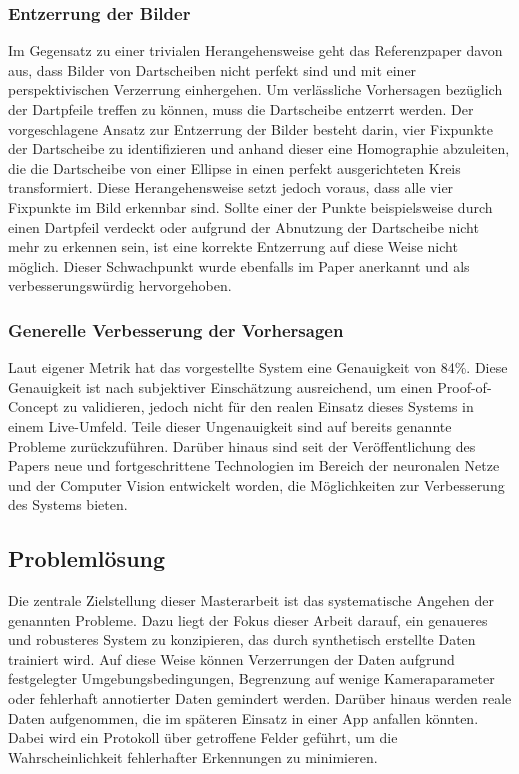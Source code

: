\subsubsection{Entzerrung der Bilder}
\label{sec:ziele:schwachstellen:entzerrung}

Im Gegensatz zu einer trivialen Herangehensweise geht das Referenzpaper davon aus, dass Bilder von Dartscheiben nicht perfekt sind und mit einer perspektivischen Verzerrung einhergehen. Um verlässliche Vorhersagen bezüglich der Dartpfeile treffen zu können, muss die Dartscheibe entzerrt werden. Der vorgeschlagene Ansatz zur Entzerrung der Bilder besteht darin, vier Fixpunkte der Dartscheibe zu identifizieren und anhand dieser eine Homographie abzuleiten, die die Dartscheibe von einer Ellipse in einen perfekt ausgerichteten Kreis transformiert. Diese Herangehensweise setzt jedoch voraus, dass alle vier Fixpunkte im Bild erkennbar sind. Sollte einer der Punkte beispielsweise durch einen Dartpfeil verdeckt oder aufgrund der Abnutzung der Dartscheibe nicht mehr zu erkennen sein, ist eine korrekte Entzerrung auf diese Weise nicht möglich. Dieser Schwachpunkt wurde ebenfalls im Paper anerkannt und als verbesserungswürdig hervorgehoben.

\subsubsection{Generelle Verbesserung der Vorhersagen}
\label{sec:ziele:schwachstellen:verbesserung}

Laut eigener Metrik hat das vorgestellte System eine Genauigkeit von 84\%. Diese Genauigkeit ist nach subjektiver Einschätzung ausreichend, um einen Proof-of-Concept zu validieren, jedoch nicht für den realen Einsatz dieses Systems in einem Live-Umfeld. Teile dieser Ungenauigkeit sind auf bereits genannte Probleme zurückzuführen. Darüber hinaus sind seit der Veröffentlichung des Papers neue und fortgeschrittene Technologien im Bereich der neuronalen Netze und der Computer Vision entwickelt worden, die Möglichkeiten zur Verbesserung des Systems bieten.


\subsection{Problemlösung}
\label{sec:ziele:problemlösung}

Die zentrale Zielstellung dieser Masterarbeit ist das systematische Angehen der genannten Probleme. Dazu liegt der Fokus dieser Arbeit darauf, ein genaueres und robusteres System zu konzipieren, das durch synthetisch erstellte Daten trainiert wird. Auf diese Weise können Verzerrungen der Daten aufgrund festgelegter Umgebungsbedingungen, Begrenzung auf wenige Kameraparameter oder fehlerhaft annotierter Daten gemindert werden. Darüber hinaus werden reale Daten aufgenommen, die im späteren Einsatz in einer App anfallen könnten. Dabei wird ein Protokoll über getroffene Felder geführt, um die Wahrscheinlichkeit fehlerhafter Erkennungen zu minimieren.

